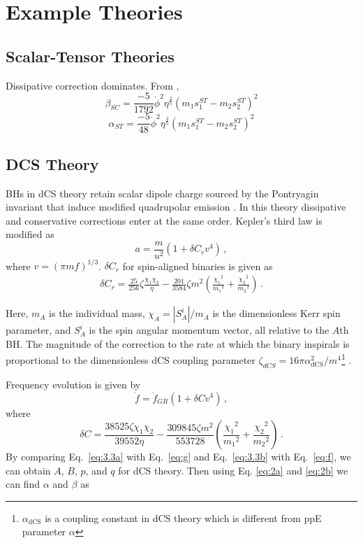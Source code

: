 \documentclass[11pt]{article}
\begin{document}
 \section{Example Theories}
 \vspace*{20pt}

 \subsection{Scalar-Tensor Theories}
 Dissipative correction dominates.  From \cite{Yunes:2016jcc},
 \begin{equation}
 \beta_{SC}=\frac{-5}{1792}\dot{\phi}^2\eta^{\frac{2}{5}}(m_1s_1^{ST}-m_2s_2^{ST})^2
 \end{equation}
 \begin{equation}
 \alpha_{ST}=\frac{-5}{48}\dot{\phi}^2\eta^{\frac{2}{5}}(m_1s_1^{ST}-m_2s_2^{ST})^2
 \end{equation}
 \subsection{DCS Theory}
\hspace{15.5pt}BHs in dCS theory retain scalar dipole charge sourced by the Pontryagin invariant that induce modified quadrupolar emission \cite{Yagi:2011xp}\cite{Yunes:2016jcc}. In this theory dissipative and conservative corrections enter at the same order. Kepler's third law is modified as \cite{Yagi:2012vf}
 \begin{equation}\label{eq:3.3a}
 a=\frac{m}{u^2}(1+\delta C_r v^4)\,,
 \end{equation}
where $v=(\pi m f)^{1/3}$. $\delta C_r$ for  spin-aligned binaries is given as
\begin{align}
\delta C_r=\frac{25}{256}\zeta \frac{\chi_1 \chi_2}{\eta}-\frac{201}{3584}\zeta m^2\left(\frac{{\chi_1}^2}{{m_1}^2}+\frac{{\chi_2}^2}{{m_2}^2}\right)\,.
\end{align} 

Here, $m_A$ is the individual mass, $\chi_A =\left | S_{A}^{i} \right |/m_A$ is the dimensionless Kerr spin parameter, and $S_{A}^{i}$ is the spin angular momentum vector, all relative to the $\mathit{A}\text{th}$ BH. The magnitude of the correction to the rate at which the binary inspirals is proportional to the dimensionless dCS coupling parameter $\zeta_{dCS}=16\pi \alpha_{\text{dCS}}^2/m^4$\footnote{$\alpha_{\text{dCS}}$ is a coupling constant in dCS theory which is different from ppE parameter $\alpha$} .


Frequency evolution is given by \cite{Yagi:2012vf}
\begin{equation}\label{eq:3.3b}
\dot{f}=\dot{f}_{GR}\left(1+\delta C v^4\right)\,,
\end{equation}
 where
 \begin{equation}
 \delta C= \frac{38525 \zeta \chi_1 \chi_2}{39552 \eta }-\frac{309845 \zeta  m^2 }{553728 }\left(\frac{{\chi_1}^2}{{m_1}^2}+\frac{{\chi_2}^2}{{m_2}^2}\right)\,.
 \end{equation}
 By comparing Eq.~\eqref{eq:3.3a} with Eq.~\eqref{eq:g} and Eq.~\eqref{eq:3.3b} with Eq.~\eqref{eq:f}, we can obtain $A$, $B$, $p$,  and $q$ for dCS theory. Then using Eq. \eqref{eq:2a} and \eqref{eq:2b} we can find $\alpha$ and $\beta$ as
 
\end{document}
